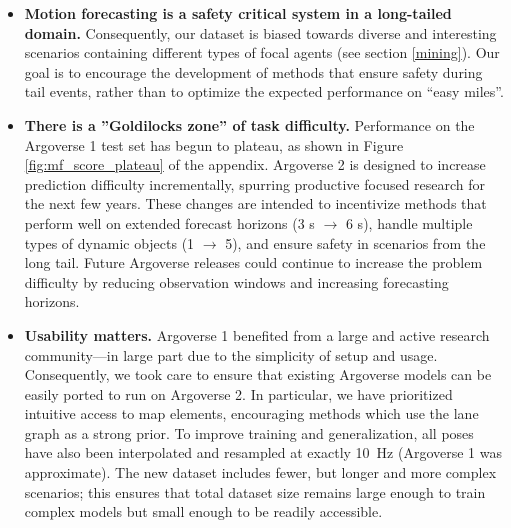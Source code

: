 \begin{itemize}
	\item \textbf{Motion forecasting is a safety critical system in a long-tailed domain.}  Consequently, our dataset is biased towards diverse and interesting scenarios containing different types of focal agents (see section \ref{mining}).  Our goal is to encourage the development of methods that ensure safety during tail events, rather than to optimize the expected performance on ``easy miles''.
	\item \textbf{There is a ''Goldilocks zone'' of task difficulty.}  Performance on the Argoverse 1 test set has begun to plateau, as shown in Figure \ref{fig:mf_score_plateau} of the appendix.  Argoverse 2 is designed to increase prediction difficulty incrementally, spurring productive focused research for the next few years.  These changes are intended to incentivize methods that perform well on extended forecast horizons (3 s $\rightarrow$ 6 s), handle multiple types of dynamic objects (1 $\rightarrow$ 5), and ensure safety in scenarios from the long tail.  Future Argoverse releases could continue to increase the problem difficulty by reducing observation windows and increasing forecasting horizons.
	\item \textbf{Usability matters.} Argoverse 1 benefited from a large and active research community---in large part due to the simplicity of setup and usage.  Consequently, we took care to ensure that existing Argoverse models can be easily ported to run on Argoverse 2.  In particular, we have prioritized intuitive access to map elements,  encouraging methods which use the lane graph as a strong prior. To improve training and generalization, all poses have also been interpolated and resampled at exactly \SI{10}{\hertz} (Argoverse 1 was approximate). The new dataset includes fewer, but longer and more complex scenarios; this ensures that total dataset size remains large enough to train complex models but small enough to be readily accessible.
\end{itemize}

